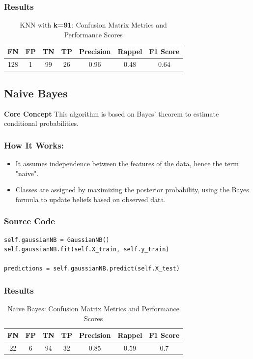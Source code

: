 \documentclass[a4paper,12pt]{article}
\begin{document}
\subsubsection*{Results}
\begin{table}[h!]
\centering
\begin{tabular}{|c|c|c|c|c|c|c|}
\hline
\textbf{FN} & \textbf{FP} & \textbf{TN} & \textbf{TP} & \textbf{Precision} & \textbf{Rappel} & \textbf{F1 Score} \\ \hline
128         & 1           & 99          & 26          & 0.96               & 0.48            & 0.64              \\ \hline
\end{tabular}
\caption{KNN with \textbf{k=91}: Confusion Matrix Metrics and Performance Scores}
\end{table}


\subsection{Naive Bayes}
\textbf{Core Concept} This algorithm is based on Bayes' theorem to estimate conditional probabilities.
\subsubsection*{How It Works:}
\begin{itemize}
    \item It assumes independence between the features of the data, hence the term "naive".
    \item Classes are assigned by maximizing the posterior probability, using the Bayes formula to update beliefs based on observed data.
\end{itemize}

\subsubsection*{Source Code}
\begin{lstlisting}[style=python]
self.gaussianNB = GaussianNB()
self.gaussianNB.fit(self.X_train, self.y_train)

predictions = self.gaussianNB.predict(self.X_test)
\end{lstlisting}

\subsubsection*{Results}
\begin{table}[h!]
\centering
\begin{tabular}{|c|c|c|c|c|c|c|}
\hline
\textbf{FN} & \textbf{FP} & \textbf{TN} & \textbf{TP} & \textbf{Precision} & \textbf{Rappel} & \textbf{F1 Score} \\ \hline
22          & 6           & 94          & 32          & 0.85               & 0.59            & 0.7              \\ \hline
\end{tabular}
\caption{Naive Bayes: Confusion Matrix Metrics and Performance Scores}
\end{table}
\end{document}
